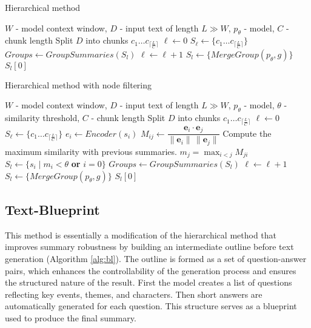 \documentclass{superfri}
\begin{document}
\noindent
\begin{minipage}[t]{0.49\textwidth}
  \begin{algorithm}[H]
  \caption{Hierarchical method}\label{alg:h}
    \begin{algorithmic}
      \Require $W$ - model context window, $D$ - input text of length $L \gg W$, $p_\theta$ - model, $C$ - chunk length
      \State Split $D$ into chunks $c_1\dots c_{\lceil \frac{L}{C} \rceil}$
      \State $\ell \gets 0$
      \State $S_\ell \gets \{c_1\dots c_{\lceil \frac{L}{C} \rceil}\}$
      \Repeat
        \State $Groups \gets GroupSummaries(S_l)$
        \State $\ell \gets \ell + 1$
          \State $S_l \gets \{MergeGroup(p_\theta,g)\}$
        \EndFor
      \State \Return $S_l[0]$
    \end{algorithmic}
  \end{algorithm}
\end{minipage}\hfill
\begin{minipage}[t]{0.49\textwidth}
  \begin{algorithm}[H]
    \caption{Hierarchical method with node filtering}\label{alg:h_f}
    \begin{algorithmic}
      \Require $W$ - model context window, $D$ - input text of length $L \gg W$, $p_\theta$ - model, $\theta$ - similarity threshold, $C$ - chunk length
      \State Split $D$ into chunks $c_1\dots c_{\lceil \frac{L}{C} \rceil}$
      \State $\ell \gets 0$
      \State $S_\ell \gets \{c_1\dots c_{\lceil \frac{L}{C} \rceil}\}$
      \Repeat
          \State $e_i \gets Encoder(s_i)$
          \State $M_{ij} \gets \dfrac{\mathbf{e}_i\cdot \mathbf{e}_j}{\|\mathbf{e}_i\|\,\|\mathbf{e}_j\|}$
          \State Compute the maximum similarity
        \State with previous summaries.
          \State $m_j=\max_{i<j} M_{ji}$
          \State $S_l \gets \{s_i \mid m_i < \theta$ \textbf{ or } $i = 0 \}$
        \EndFor
        \State $Groups \gets GroupSummaries(S_l)$
        \State $\ell \gets \ell + 1$
          \State $S_l \gets \{MergeGroup(p_\theta,g)\}$
        \EndFor
      \State \Return $S_l[0]$
    \end{algorithmic}
  \end{algorithm}
\end{minipage}

\vspace{0.4em}
\subsection{Text-Blueprint}
This method \cite{blueprint} is essentially a modification of the hierarchical method 
that improves summary robustness by building an intermediate outline before text generation  (Algorithm \ref{alg:bl}).
The outline is formed as a set of question-answer pairs, which enhances the controllability of the generation process and ensures the structured nature of the result.
First the model creates a list of questions reflecting key events, themes, and characters. Then short answers are automatically generated for each question.
This structure serves as a blueprint used to produce the final summary.
\end{document}
